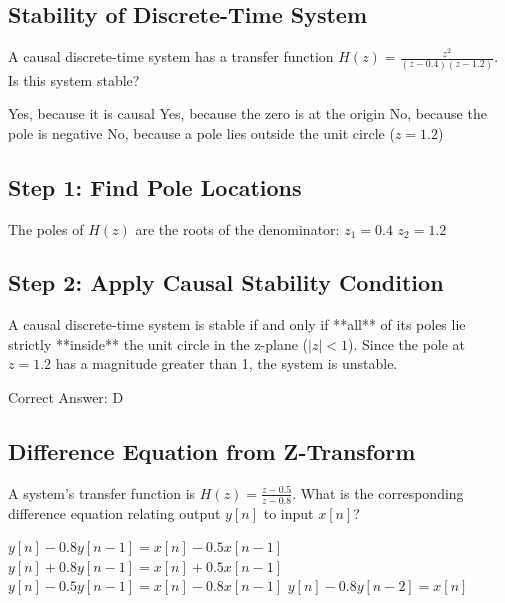 \subsection{Stability of Discrete-Time System}

A causal discrete-time system has a transfer function $H(z) = \frac{z^2}{(z - 0.4)(z - 1.2)}$. Is this system stable?

\begin{choices}
    \choice Yes, because it is causal
    \choice Yes, because the zero is at the origin
    \choice No, because the pole is negative
    \correctchoice No, because a pole lies outside the unit circle ($z = 1.2$)
\end{choices}

\begin{solution}

\subsection*{Step 1: Find Pole Locations}
The poles of $H(z)$ are the roots of the denominator:
$z_1 = 0.4$
$z_2 = 1.2$

\subsection*{Step 2: Apply Causal Stability Condition}
A causal discrete-time system is stable if and only if **all** of its poles lie strictly **inside** the unit circle in the z-plane ($|z| < 1$).
Since the pole at $z = 1.2$ has a magnitude greater than 1, the system is unstable.

Correct Answer: D
\end{solution}

\clearpage

\subsection{Difference Equation from Z-Transform}

A system's transfer function is $H(z) = \frac{z - 0.5}{z - 0.8}$. What is the corresponding difference equation relating output $y[n]$ to input $x[n]$?

\begin{choices}
    \correctchoice $y[n] - 0.8 y[n-1] = x[n] - 0.5 x[n-1]$
    \choice $y[n] + 0.8 y[n-1] = x[n] + 0.5 x[n-1]$
    \choice $y[n] - 0.5 y[n-1] = x[n] - 0.8 x[n-1]$
    \choice $y[n] - 0.8 y[n-2] = x[n]$
\end{choices}

